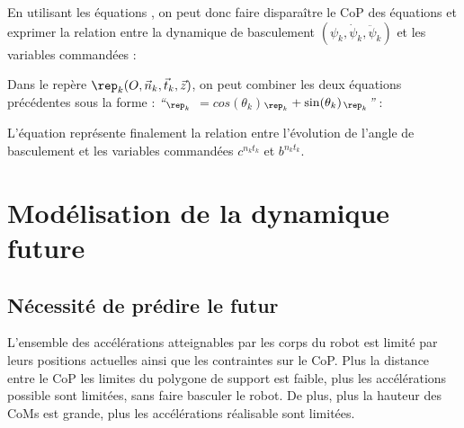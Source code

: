 				En utilisant les équations  , on peut donc faire disparaître le CoP des équations  et exprimer la relation entre la dynamique de basculement $(\psi_k, \dot{\psi}_k, \ddot{\psi}_k)$ et les variables commandées :
				
				Dans le repère $\rep_k(O, \vec{n}_k, \vec{t}_k, \vec{z})$, on peut combiner les deux équations précédentes  sous la forme :
				\textit{``$_{\rep_k}$ $=cos(\theta_k)$$_{\rep_k}+\sin(\theta_k)$$_{\rep_k}$''} : 
				
				L'équation  représente finalement la relation entre l'évolution de l'angle de basculement et les variables commandées  $c^{n_kt_k}$ et $b^{n_kt_k}$.

	\section{Modélisation de la dynamique future}
		\subsection{Nécessité de prédire le futur}
	
			L'ensemble des accélérations atteignables par les corps du robot est limité par leurs positions actuelles ainsi que les contraintes sur le CoP. 
			Plus la distance entre le CoP les limites du polygone de support est faible, plus les accélérations possible sont limitées, sans faire basculer le robot.
			De plus, plus la hauteur des CoMs est grande, plus les accélérations réalisable sont limitées.
			
